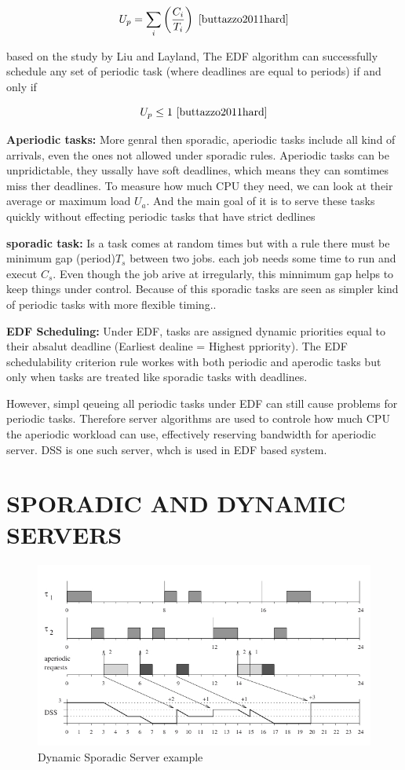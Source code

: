 \documentclass[conference]{IEEEtran}
\begin{document}
\[
U_p = \sum_i \left( \frac{C_i}{T_i} \right)
\ \cite{buttazzo2011hard} \]

based on the study by Liu and Layland\cite{liu1973scheduling}, The EDF algorithm can successfully schedule any set of periodic task (where deadlines are equal to periods) if and only if 

\[
U_p \leq 1
\ \cite{buttazzo2011hard} \]

\textbf{Aperiodic tasks:} More genral then sporadic, aperiodic tasks include all kind of arrivals, even the ones not allowed under sporadic rules. Aperiodic tasks can be unpridictable, they ussally have soft deadlines, which means they can somtimes miss ther deadlines. To measure how much CPU they need, we can look at their average or maximum load $U_a$. And the main goal of it is to serve these tasks quickly without effecting periodic tasks that have strict dedlines\cite{buttazzo2011hard}

\textbf{sporadic task:} Is a task comes at random times but with a rule there must be minimum gap (period)$T_s$ between two jobs. each job needs some time to run and execut $C_s$. Even though the job arive at irregularly, this minnimum gap helps to keep things under control. Because of this sporadic tasks are seen as simpler kind of periodic tasks with more flexible timing.\cite{buttazzo2011hard}.

\textbf{EDF Scheduling:}  Under EDF, tasks are assigned dynamic priorities equal to their absalut deadline (Earliest dealine = Highest ppriority). The EDF schedulability criterion rule workes with both periodic and aperodic tasks but only when tasks are treated like sporadic tasks with deadlines\cite{spuri1994efficient, buttazzo2011hard}.

However, simpl qeueing all periodic tasks under EDF can still cause problems for periodic tasks. Therefore server algorithms are used to controle how much CPU the aperiodic workload can use, effectively reserving bandwidth for aperiodic server\cite{buttazzo2011hard}. DSS is one such server, whch is used in EDF based system\cite{buttazzo2011hard}.

\section{SPORADIC AND DYNAMIC SERVERS}


\begin{figure}
    \centering
    \includegraphics[width=0.8\linewidth]{Dynamic Sporadic Server example.jpeg}
    \caption{Dynamic Sporadic Server example \cite{buttazzo2011hard}}
    \label{fig:enter-label}
\end{figure}
\end{document}
